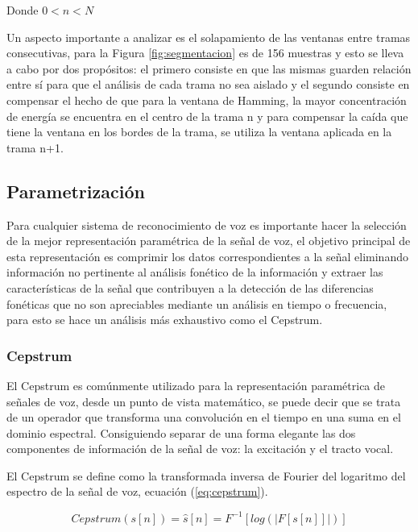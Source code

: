 Donde $0<n<N$

Un aspecto importante a analizar es el solapamiento de las ventanas entre tramas consecutivas, para la Figura \ref{fig:segmentacion} es de 156 muestras y esto se lleva a cabo por dos propósitos: el primero consiste en que las mismas guarden relación entre sí para que el análisis de cada trama no sea aislado y el segundo consiste en compensar el hecho de que para la ventana de Hamming, la mayor concentración de energía se encuentra en el centro de la trama n y para compensar la caída que tiene la ventana en los bordes de la trama, se utiliza la ventana aplicada en la trama n+1. \cite{SalcedoCherubini2006}

\subsection{Parametrización}

Para cualquier sistema de reconocimiento de voz es importante hacer la selección de la mejor representación paramétrica de la señal de voz, el objetivo principal de esta representación es comprimir los datos correspondientes a la señal eliminando información no pertinente al análisis fonético de la información y extraer las características de la señal que contribuyen a la detección de las diferencias fonéticas que no son apreciables mediante un análisis en tiempo o frecuencia, para esto se hace un análisis más exhaustivo como el Cepstrum. \cite{SalcedoCherubini2006}

\subsubsection{Cepstrum}

El Cepstrum es comúnmente utilizado para la representación paramétrica de señales de voz, desde un punto de vista matemático, se puede decir que se trata de un operador que transforma una convolución en el tiempo en una suma en el dominio espectral. Consiguiendo separar de una forma elegante las dos componentes de información de la señal de voz: la excitación y el tracto vocal. \cite{David2012}

El Cepstrum se define como la transformada inversa de Fourier del logaritmo del espectro de la señal de voz, ecuación (\ref{eq:cepstrum}).

\begin{equation}\label{eq:cepstrum}
	Cepstrum(s[n])=\hat{s}[n]=F^{-1}[log(|F[s[n]]|)]
\end{equation}

